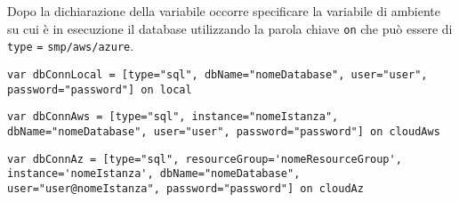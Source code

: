 Dopo la dichiarazione della variabile occorre specificare la variabile di ambiente su cui è in esecuzione il database utilizzando la parola chiave \verb|on| che può essere di \verb|type| \verb|=| \verb|smp/aws/azure|.\\

\begin{lstlisting}[language=FLY,caption={Dichiarazione di entità sql per la connessione ad un database locale.}, label={lst:dbLocal}]
var dbConnLocal = [type="sql", dbName="nomeDatabase", user="user", password="password"] on local
\end{lstlisting}

\begin{lstlisting}[language=FLY,caption={Dichiarazione di entità sql per la connessione ad un database su AWS.}, label={lst:dbAWS}]
var dbConnAws = [type="sql", instance="nomeIstanza", dbName="nomeDatabase", user="user", password="password"] on cloudAws
\end{lstlisting}

\begin{lstlisting}[language=FLY,caption={Dichiarazione di entità sql per la connessione ad un database locale.}, label={lst:dbAzure}]
var dbConnAz = [type="sql", resourceGroup='nomeResourceGroup', instance='nomeIstanza', dbName="nomeDatabase", user="user@nomeIstanza", password="password"] on cloudAz
\end{lstlisting}

